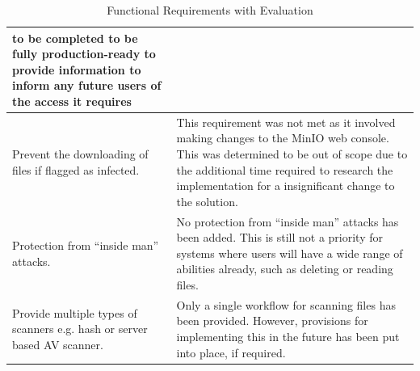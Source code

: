 \documentclass[12pt, conference, final, a4paper, onecolumn, compsoc]{IEEEtran}
\begin{document}
\begin{table}[H]
\begin{tabular}{|p{}|p{}|}
    to be completed to be fully production-ready to provide information to
                                                                                inform
                                                                                any
                                                                                future
                                                                                users
                                                                                of
                                                                                the
                                                                                access
                                                                                it requires
                                                                              \\ \hline \hline

    Prevent the downloading of files if flagged as infected. & This requirement
                                                              was not met as it
                                                              involved making
                                                              changes to the
                                                              MinIO web console.
    This was determined to be out of scope due to the additional time required
                                                              to research the
                                                              implementation for
    a insignificant change to the solution. \\ \hline
    Protection from ``inside man'' attacks. & No protection from ``inside man''
                                              attacks has been added. This is
                                              still not a priority for systems
                                              where users will have a wide range
    of abilities already, such as deleting or reading files. \\ \hline
    Provide multiple types of scanners e.g. hash or server based AV scanner. &
                                                                               Only
                                                                               a
    single workflow for scanning files has been provided. However, provisions
                                                                               for
                                                                               implementing
    this in the future has been put into place, if required.  \\ \hline
  \end{tabular}
  \caption{Functional Requirements with Evaluation}
  \label{tab:functional_reqs_evaluation}
\end{table}
\end{document}
